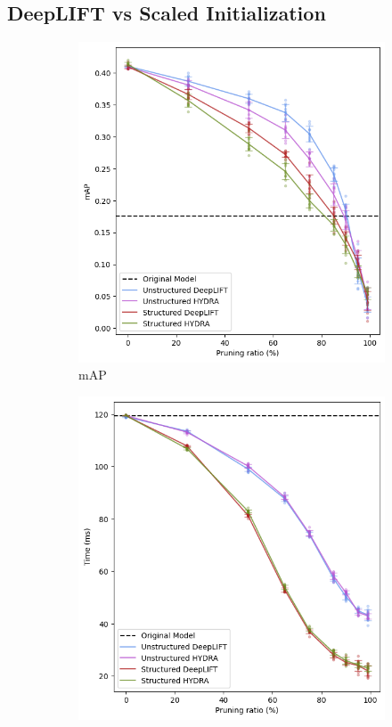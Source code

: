\documentclass[journal,onecolumn,12pt]{IEEEtran}
\begin{document}
\subsection{DeepLIFT vs Scaled Initialization}
\label{sec1}

\begin{figure}
    \centering
    \captionsetup{justification=centering,margin=1cm}
    \begin{subfigure}[b]{.5\textwidth}
      \centering
      \includegraphics[width=1\linewidth]{figures/mAP1.PNG}
      \caption{mAP}
      \label{fig:mAP1}
    \end{subfigure}%
    \begin{subfigure}[b]{.5\textwidth}
      \centering
      \includegraphics[width=1\linewidth]{figures/time1.PNG}

\end{subfigure}
\end{figure}
\end{document}
